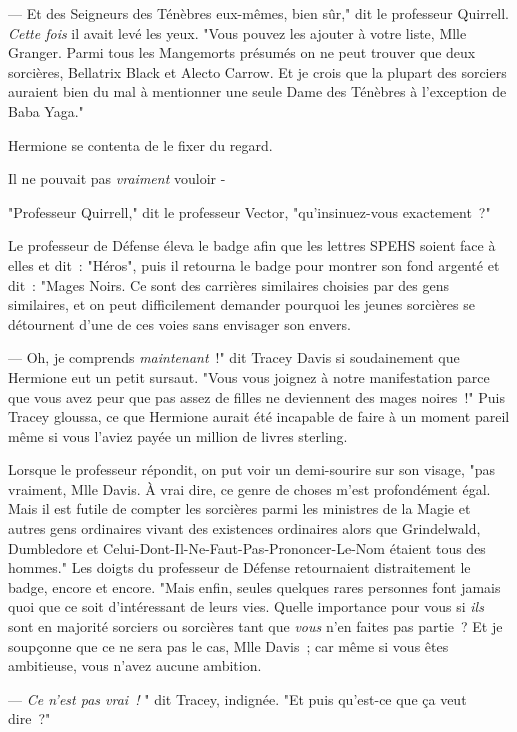 --- Et des Seigneurs des Ténèbres eux-mêmes, bien sûr," dit le professeur Quirrell. \emph{Cette fois} il avait levé les yeux. "Vous pouvez les ajouter à votre liste, Mlle Granger. Parmi tous les Mangemorts présumés on ne peut trouver que deux sorcières, Bellatrix Black et Alecto Carrow. Et je crois que la plupart des sorciers auraient bien du mal à mentionner une seule Dame des Ténèbres à l'exception de Baba Yaga."

Hermione se contenta de le fixer du regard.

Il ne pouvait pas \emph{vraiment} vouloir -

"Professeur Quirrell," dit le professeur Vector, "qu'insinuez-vous exactement~?"

Le professeur de Défense éleva le badge afin que les lettres SPEHS soient face à elles et dit~: "Héros", puis il retourna le badge pour montrer son fond argenté et dit~: "Mages Noirs. Ce sont des carrières similaires choisies par des gens similaires, et on peut difficilement demander pourquoi les jeunes sorcières se détournent d'une de ces voies sans envisager son envers.

--- Oh, je comprends \emph{maintenant}~!" dit Tracey Davis si soudainement que Hermione eut un petit sursaut. "Vous vous joignez à notre manifestation parce que vous avez peur que pas assez de filles ne deviennent des mages noires~!" Puis Tracey gloussa, ce que Hermione aurait été incapable de faire à un moment pareil même si vous l'aviez payée un million de livres sterling.

Lorsque le professeur répondit, on put voir un demi-sourire sur son visage, "pas vraiment, Mlle Davis. À vrai dire, ce genre de choses m'est profondément égal. Mais il est futile de compter les sorcières parmi les ministres de la Magie et autres gens ordinaires vivant des existences ordinaires alors que Grindelwald, Dumbledore et Celui-Dont-Il-Ne-Faut-Pas-Prononcer-Le-Nom étaient tous des hommes." Les doigts du professeur de Défense retournaient distraitement le badge, encore et encore. "Mais enfin, seules quelques rares personnes font jamais quoi que ce soit d'intéressant de leurs vies. Quelle importance pour vous si \emph{ils} sont en majorité sorciers ou sorcières tant que \emph{vous} n'en faites pas partie~? Et je soupçonne que ce ne sera pas le cas, Mlle Davis~; car même si vous êtes ambitieuse, vous n'avez aucune ambition.

--- \emph{Ce n'est pas vrai~!} " dit Tracey, indignée. "Et puis qu'est-ce que ça veut dire~?"

